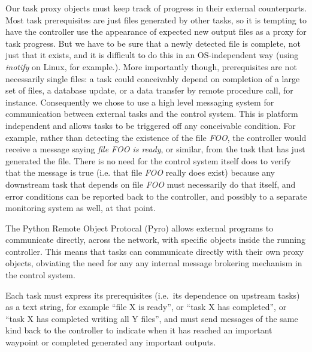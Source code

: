 \documentclass[11pt,a4paper]{article}
\begin{document}
Our task proxy objects must keep track of progress in their external
counterparts. Most task prerequisites are just files generated by other
tasks, so it is tempting to have the controller use the appearance of
expected new output files as a proxy for task progress. But we have to
be sure that a newly detected file is complete, not just that it exists,
and it is difficult to do this in an OS-independent way (using {\em
inotify} on Linux, for example.). 
More importantly though, prerequisites are not necessarily single files:
a task could conceivably depend on completion of a large set of files, a
database update, or a data transfer by remote procedure call, for
instance. Consequently we chose to use a high level messaging system for
communication between external tasks and the control system. This is
platform independent and allows tasks to be triggered off any
conceivable condition. For example, rather than detecting the existence
of the file {\em FOO}, the controller would receive a message saying
{\em file FOO is ready}, or similar, from the task that has
just generated the file.  There is no need for the control system itself
does to verify that the message is true (i.e. that file {\em FOO}
really does exist) because any downstream task that
depends on file {\em FOO} must necessarily do that itself, and error 
conditions can be reported back to the controller, and possibly to a
separate monitoring system as well, at that point.

The Python Remote Object Protocal (Pyro) allows external programs to
communicate directly, across the network, with specific objects inside
the running controller. This means that tasks can communicate directly
with their own proxy objects, obviating the need for any any internal
message brokering mechanism in the control system.    

Each task must express its prerequisites (i.e.\ its dependence on
upstream tasks) as a text string, for example ``file X is ready'', or
``task X has completed'', or ``task X has completed writing all Y
files'', and must send messages of the same kind back to the controller
to indicate when it has reached an important waypoint or completed
generated any important outputs.  
\end{document}
